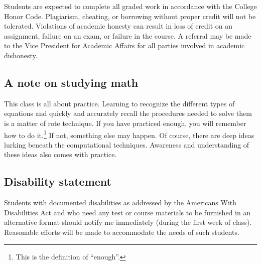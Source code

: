 \documentclass[symmetric]{tufte-handout}
\begin{document}
Students are expected to complete all graded work in accordance with the
College Honor Code. Plagiarism, cheating, or borrowing without proper credit
will not be tolerated.  Violations of academic honesty can result in loss of
credit on an assignment, failure on an exam, or failure in the course. A
referral may be made to the Vice President for Academic Affairs for all
parties involved in academic dishonesty.

\subsection{A note on studying math}

This class is all about practice. Learning to recognize the different types of
equations and quickly and accurately recall the procedures needed to solve
them is a matter of rote technique. If you have practiced enough, you will
remember how to do it.\footnote{This is the definition of “enough”.} If not,
something else may happen. Of course, there are deep ideas lurking beneath the
computational techniques. Awareness and understanding of these ideas also
comes with practice.

\subsection{Disability statement}

Students with documented disabilities as addressed by the Americans With
Disabilities Act and who need any test or course materials to be furnished in
an alternative format should notify me immediately (during the first week of
class).  Reasonable efforts will be made to accommodate the needs of such
students. 
\end{document}
